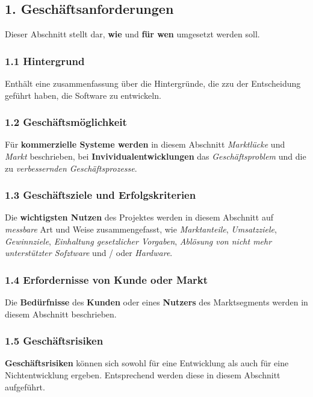\subsection*{1. Geschäftsanforderungen}
Dieser Abschnitt stellt dar, \textbf{wie} und \textbf{für wen} umgesetzt werden soll.

\subsubsection*{1.1 Hintergrund}
Enthält eine zusammenfassung über die Hintergründe, die zzu der Entscheidung geführt haben, die Software zu entwickeln.

\subsubsection*{1.2 Geschäftsmöglichkeit}
Für \textbf{kommerzielle Systeme werden} in diesem Abschnitt \textit{Marktlücke} und \textit{Markt} beschrieben, bei \textbf{Invividualentwicklungen} das \textit{Geschäftsproblem} und die zu \textit{verbessernden Geschäftsprozesse}.

\subsubsection*{1.3 Geschäftsziele und Erfolgskriterien}
Die \textbf{wichtigsten Nutzen} des Projektes werden in diesem Abschnitt auf \textit{messbare} Art und Weise zusammengefasst, wie \textit{Marktanteile}, \textit{Umsatzziele}, \textit{Gewinnziele}, \textit{Einhaltung gesetzlicher Vorgaben}, \textit{Ablösung von nicht mehr unterstützter Sofztware} und / oder \textit{Hardware}.

\subsubsection*{1.4 Erfordernisse von Kunde oder Markt}
Die \textbf{Bedürfnisse} des \textbf{Kunden} oder eines \textbf{Nutzers} des Marktsegments werden in diesem Abschnitt beschrieben.

\subsubsection*{1.5 Geschäftsrisiken}
\textbf{Geschäftsrisiken} können sich sowohl für eine Entwicklung als auch für eine Nichtentwicklung ergeben.
Entsprechend werden diese in diesem Abschnitt aufgeführt.


